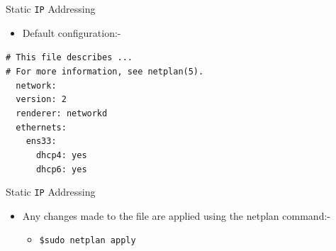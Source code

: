 \documentclass{beamer}
\begin{document}
\begin{frame}{Static \texttt{IP} Addressing}
  \begin{itemize}
    \item Default configuration:-
  \end{itemize}
    \begin{center}
      \begin{minipage}{8cm}
        \begin{block}{}
          \texttt{\# This file describes ...\\
          \# For more information, see netplan(5).\\
          ~~network:\\
          ~~version: 2\\
          ~~renderer: networkd\\
          ~~ethernets:\\
          ~~~~ens33:\\
          ~~~~~~dhcp4: yes\\
          ~~~~~~dhcp6: yes}
        \end{block}
      \end{minipage}
    \end{center}
\end{frame}

\begin{frame}{Static \texttt{IP} Addressing}
  \begin{itemize}
    \item Any changes made to the file are applied using the netplan command:-
    \begin{itemize}
      \item \texttt{\$sudo netplan apply}
    \end{itemize}
  \end{itemize}
\end{frame}
\end{document}
